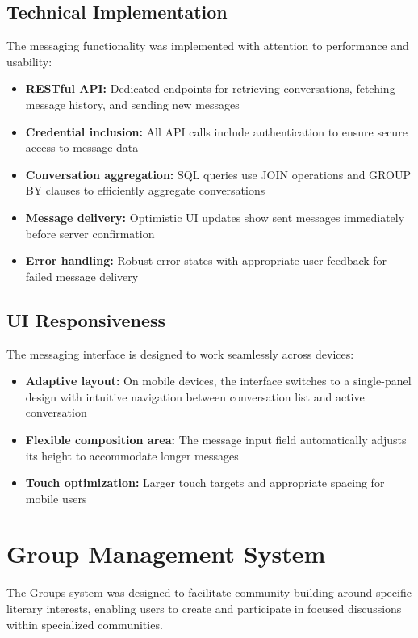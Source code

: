 \documentclass{article}
\begin{document}
\subsection{Technical Implementation}
The messaging functionality was implemented with attention to performance and usability:
\begin{itemize}
    \item \textbf{RESTful API:} Dedicated endpoints for retrieving conversations, fetching message history, and sending new messages
    \item \textbf{Credential inclusion:} All API calls include authentication to ensure secure access to message data
    \item \textbf{Conversation aggregation:} SQL queries use JOIN operations and GROUP BY clauses to efficiently aggregate conversations
    \item \textbf{Message delivery:} Optimistic UI updates show sent messages immediately before server confirmation
    \item \textbf{Error handling:} Robust error states with appropriate user feedback for failed message delivery
\end{itemize}

\subsection{UI Responsiveness}
The messaging interface is designed to work seamlessly across devices:
\begin{itemize}
    \item \textbf{Adaptive layout:} On mobile devices, the interface switches to a single-panel design with intuitive navigation between conversation list and active conversation
    \item \textbf{Flexible composition area:} The message input field automatically adjusts its height to accommodate longer messages
    \item \textbf{Touch optimization:} Larger touch targets and appropriate spacing for mobile users
\end{itemize}

\section{Group Management System}
The Groups system was designed to facilitate community building around specific literary interests, enabling users to create and participate in focused discussions within specialized communities.
\end{document}
